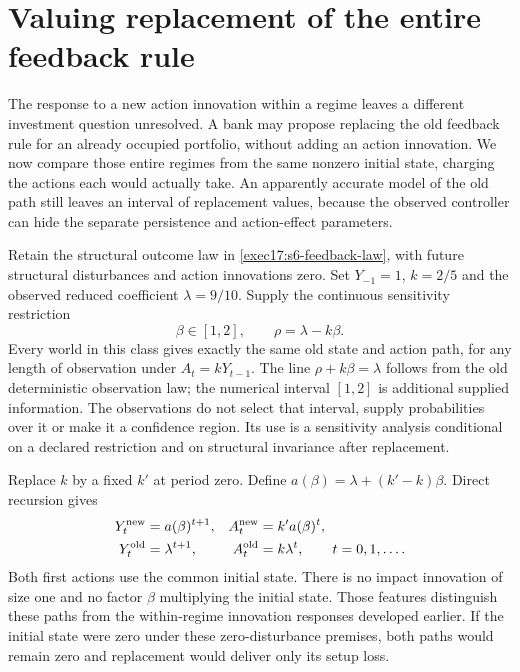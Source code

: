 \section{Valuing replacement of the entire feedback rule}
\label{exec17:s6-full-rule}

The response to a new action innovation within a regime leaves a different
investment question unresolved. A bank may propose replacing the old
feedback rule for an already occupied portfolio, without adding an action
innovation. We now compare those entire regimes from the same nonzero
initial state, charging the actions each would actually take. An apparently
accurate model of the old path still leaves an interval of replacement
values, because the observed controller can hide the separate persistence
and action-effect parameters.

Retain the structural outcome law in \eqref{exec17:s6-feedback-law}, with
future structural disturbances and action innovations zero. Set $Y_{-1}=1$,
$k=2/5$ and the observed reduced coefficient $\lambda=9/10$. Supply the
continuous sensitivity restriction
\begin{equation}
 \beta\in[1,2],\qquad \rho=\lambda-k\beta.
 \label{exec17:s6-controller-class}
\end{equation}
Every world in this class gives exactly the same old state and action path,
for any length of observation under $A_t=kY_{t-1}$. The line
$\rho+k\beta=\lambda$ follows from the old deterministic observation law;
the numerical interval $[1,2]$ is additional supplied information. The
observations do not select that interval, supply probabilities over it or
make it a confidence region. Its use is a sensitivity analysis conditional
on a declared restriction and on structural invariance after replacement.

Replace $k$ by a fixed $k'$ at period zero. Define
$a(\beta)=\lambda+(k'-k)\beta$. Direct recursion gives
\begin{align}
 Y_t^{\rm new}&=a(\beta)^{t+1},&
 A_t^{\rm new}&=k'a(\beta)^t,\nonumber\\
 Y_t^{\rm old}&=\lambda^{t+1},&
 A_t^{\rm old}&=k\lambda^t,\qquad t=0,1,\ldots.
 \label{exec17:s6-full-paths}
\end{align}
Both first actions use the common initial state. There is no impact
innovation of size one and no factor $\beta$ multiplying the initial
state. Those features distinguish these paths from the within-regime
innovation responses developed earlier. If the initial state were zero
under these zero-disturbance premises, both paths would remain zero and
replacement would deliver only its setup loss.

